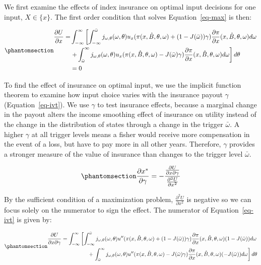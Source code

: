 \documentclass[
  letterpaper,
  DIV=11,
  numbers=noendperiod]{scrartcl}
\theoremstyle{plain}
\theoremstyle{plain}
\theoremstyle{remark}
\begin{document}
We first examine the effects of index insurance on optimal input
decisions for one input, \(X\in\{x\}\). The first order condition that
solves Equation~\ref{eq-max} is then:

\begin{equation}\phantomsection\label{eq-foc1}{
\begin{aligned}
\frac{\partial U}{\partial x}=&\int^{\infty}_{-\infty}\left[ \int^{\bar \omega}_{-\infty}j_{\omega,\theta}(\omega,\theta)u_{x}(\pi(x,\hat{B},\theta,\omega)+(1-J(\bar \omega))\gamma)\frac{\partial \pi}{\partial x}(x,\hat{B},\theta,\omega)d\omega\right.\\
&\left.+\int^{\infty}_{\bar{\omega}}j_{\omega,\theta}(\omega,\theta) u_{x}(\pi(x,\hat{B},\theta,\omega)-J(\bar \omega)\gamma)\frac{\partial \pi}{\partial x}(x,\hat{B},\theta,\omega)d\omega\right] d\theta\\
&=0
\end{aligned}
}\end{equation}

To find the effect of insurance on optimal input, we use the implicit
function theorem to examine how input choice varies with the insurance
payout \(\gamma\) (Equation~\ref{eq-ivt}). We use \(\gamma\) to test
insurance effects, because a marginal change in the payout alters the
income smoothing effect of insurance on utility instead of the change in
the distribution of states through a change in the trigger
\(\bar \omega\). A higher \(\gamma\) at all trigger levels means a
fisher would receive more compensation in the event of a loss, but have
to pay more in all other years. Therefore, \(\gamma\) provides a
stronger measure of the value of insurance than changes to the trigger
level \(\bar\omega\).

\begin{equation}\phantomsection\label{eq-ivt}{
\frac{\partial x^{*}}{\partial \gamma}=-\frac{\frac{\partial U}{\partial x \partial \gamma}}{\frac{\partial^2 U}{\partial x^{2}}}
}\end{equation}

By the sufficient condition of a maximization problem,
\(\frac{\partial^2 U}{\partial x^{2}}\) is negative so we can focus
solely on the numerator to sign the effect. The numerator of
Equation~\ref{eq-ivt} is given by:

\begin{equation}\phantomsection\label{eq-xgam}{
\begin{aligned}
\frac{\partial U}{\partial x \partial \gamma}=\int^{\infty}_{-\infty}\left[ \int^{\bar \omega}_{-\infty}j_{\omega,\theta}(\omega,\theta)u''(\pi(x,\hat{B},\theta,\omega)+(1-J(\bar \omega))\gamma)\frac{\partial \pi}{\partial x}(x,\hat{B},\theta,\omega)(1-J(\bar \omega))d\omega\right.\\
+\left.\int^{\infty}_{\bar{\omega}}j_{\omega,\theta}(\omega,\theta) u''(\pi(x,\hat{B},\theta,\omega)-J(\bar \omega)\gamma)\frac{\partial \pi}{\partial x}(x,\hat{B},\theta,\omega)(-J(\bar \omega))d\omega\right] d\theta
\end{aligned}
}\end{equation}
\end{document}
